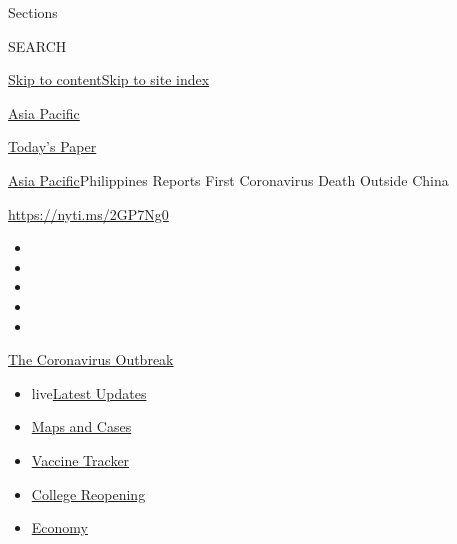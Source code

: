 Sections

SEARCH

\protect\hyperlink{site-content}{Skip to
content}\protect\hyperlink{site-index}{Skip to site index}

\href{https://www.nytimes3xbfgragh.onion/section/world/asia}{Asia
Pacific}

\href{https://myaccount.nytimes3xbfgragh.onion/auth/login?response_type=cookie\&client_id=vi}{}

\href{https://www.nytimes3xbfgragh.onion/section/todayspaper}{Today's
Paper}

\href{/section/world/asia}{Asia Pacific}\textbar{}Philippines Reports
First Coronavirus Death Outside China

\url{https://nyti.ms/2GP7Ng0}

\begin{itemize}
\item
\item
\item
\item
\item
\end{itemize}

\href{https://www.nytimes3xbfgragh.onion/news-event/coronavirus?action=click\&pgtype=Article\&state=default\&region=TOP_BANNER\&context=storylines_menu}{The
Coronavirus Outbreak}

\begin{itemize}
\tightlist
\item
  live\href{https://www.nytimes3xbfgragh.onion/2020/08/04/world/coronavirus-covid-19.html?action=click\&pgtype=Article\&state=default\&region=TOP_BANNER\&context=storylines_menu}{Latest
  Updates}
\item
  \href{https://www.nytimes3xbfgragh.onion/interactive/2020/us/coronavirus-us-cases.html?action=click\&pgtype=Article\&state=default\&region=TOP_BANNER\&context=storylines_menu}{Maps
  and Cases}
\item
  \href{https://www.nytimes3xbfgragh.onion/interactive/2020/science/coronavirus-vaccine-tracker.html?action=click\&pgtype=Article\&state=default\&region=TOP_BANNER\&context=storylines_menu}{Vaccine
  Tracker}
\item
  \href{https://www.nytimes3xbfgragh.onion/2020/08/02/us/covid-college-reopening.html?action=click\&pgtype=Article\&state=default\&region=TOP_BANNER\&context=storylines_menu}{College
  Reopening}
\item
  \href{https://www.nytimes3xbfgragh.onion/live/2020/08/03/business/stock-market-today-coronavirus?action=click\&pgtype=Article\&state=default\&region=TOP_BANNER\&context=storylines_menu}{Economy}
\end{itemize}

